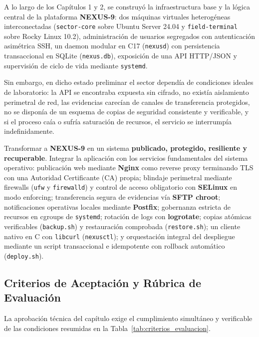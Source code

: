 \documentclass[10pt,a4paper]{article}
\begin{document}
A lo largo de los Capítulos 1 y 2, se construyó la infraestructura base y la lógica central de la plataforma \textbf{NEXUS-9}: dos máquinas virtuales heterogéneas interconectadas (\texttt{sector-core} sobre Ubuntu Server 24.04 y \texttt{field-terminal} sobre Rocky Linux 10.2), administración de usuarios segregados con autenticación asimétrica SSH, un daemon modular en C17 (\texttt{nexusd}) con persistencia transaccional en SQLite (\texttt{nexus.db}), exposición de una API HTTP/JSON y supervisión de ciclo de vida mediante \texttt{systemd}.

Sin embargo, en dicho estado preliminar el sector dependía de condiciones ideales de laboratorio: la API se encontraba expuesta sin cifrado, no existía aislamiento perimetral de red, las evidencias carecían de canales de transferencia protegidos, no se disponía de un esquema de copias de seguridad consistente y verificable, y si el proceso caía o sufría saturación de recursos, el servicio se interrumpía indefinidamente.

\begin{notabox}
    Transformar a \textbf{NEXUS-9} en un sistema \textbf{publicado, protegido, resiliente y recuperable}. Integrar la aplicación con los servicios fundamentales del sistema operativo: publicación web mediante \textbf{Nginx} como reverse proxy terminando TLS con una Autoridad Certificante (CA) propia; blindaje perimetral mediante firewalls (\texttt{ufw} y \texttt{firewalld}) y control de acceso obligatorio con \textbf{SELinux} en modo enforcing; transferencia segura de evidencias vía \textbf{SFTP chroot}; notificaciones operativas locales mediante \textbf{Postfix}; gobernanza estricta de recursos en cgroups de \texttt{systemd}; rotación de logs con \textbf{logrotate}; copias atómicas verificables (\texttt{backup.sh}) y restauración comprobada (\texttt{restore.sh}); un cliente nativo en C con \texttt{libcurl} (\texttt{nexusctl}); y orquestación integral del despliegue mediante un script transaccional e idempotente con rollback automático (\texttt{deploy.sh}).
\end{notabox}

\subsection{Criterios de Aceptación y Rúbrica de Evaluación}

La aprobación técnica del capítulo exige el cumplimiento simultáneo y verificable de las condiciones resumidas en la Tabla~\ref{tab:criterios_evaluacion}.
\end{document}
